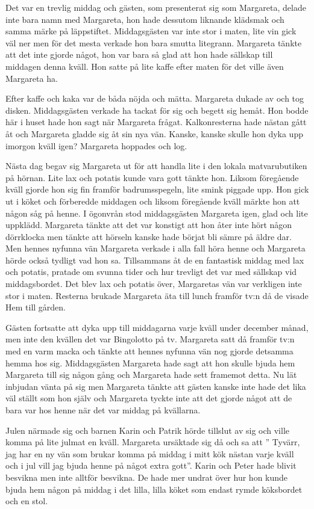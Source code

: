 Det var en trevlig middag och gästen, som presenterat sig som Margareta, delade inte bara namn med Margareta, hon hade dessutom liknande klädsmak och samma märke på läppstiftet. Middagsgästen var inte stor i maten, lite vin gick väl ner men för det mesta verkade hon bara smutta litegrann. Margareta tänkte att det inte gjorde något, hon var bara så glad att hon hade sällskap till middagen denna kväll. Hon satte på lite kaffe efter maten för det ville även Margareta ha. 

Efter kaffe och kaka var de båda nöjda och mätta. Margareta dukade av och tog disken. Middagsgästen verkade ha tackat för sig och begett sig hemåt. Hon bodde här i huset hade hon sagt när Margareta frågat. Kalkonresterna hade nästan gått åt och Margareta gladde sig åt sin nya vän. Kanske, kanske skulle hon dyka upp imorgon kväll igen? Margareta hoppades och log. 

Nästa dag begav sig Margareta ut för att handla lite i den lokala matvarubutiken på hörnan. Lite lax och potatis kunde vara gott tänkte hon. Liksom föregående kväll gjorde hon sig fin framför badrumsspegeln, lite smink piggade upp. Hon gick ut i köket och förberedde middagen och liksom föregående kväll märkte hon att någon såg på henne. I ögonvrån stod middagsgästen Margareta igen, glad och lite uppklädd. Margareta tänkte att det var konstigt att hon åter inte hört någon dörrklocka men tänkte att hörseln kanske hade börjat bli sämre på äldre dar. Men hennes nyfunna vän Margareta verkade i alla fall höra henne och Margareta hörde också tydligt vad hon sa. Tillsammans åt de en fantastisk middag med lax och potatis, pratade om svunna tider och hur trevligt det var med sällskap vid middagsbordet. Det blev lax och potatis över, Margaretas vän var verkligen inte stor i maten. Resterna brukade Margareta äta till lunch framför tv:n då de visade Hem till gården. 

Gästen fortsatte att dyka upp till middagarna varje kväll under december månad, men inte den kvällen det var Bingolotto på tv. Margareta satt då framför tv:n med en varm macka och tänkte att hennes nyfunna vän nog gjorde detsamma hemma hos sig. Middagsgästen Margareta hade sagt att hon skulle bjuda hem Margareta till sig någon gång och Margareta hade sett framemot detta. Nu lät inbjudan vänta på sig men Margareta tänkte att gästen kanske inte hade det lika väl ställt som hon själv och Margareta tyckte inte att det gjorde något att de bara var hos henne när det var middag på kvällarna.

Julen närmade sig och barnen Karin och Patrik hörde tillslut av sig och ville komma på lite julmat en kväll. Margareta ursäktade sig då och sa att ” Tyvärr, jag har en ny vän som brukar komma på middag i mitt kök nästan varje kväll och i jul vill jag bjuda henne på något extra gott”. Karin och Peter hade blivit besvikna men inte alltför besvikna. De hade mer undrat över hur hon kunde bjuda hem någon på middag i det lilla, lilla köket som endast rymde köksbordet och en stol. 


